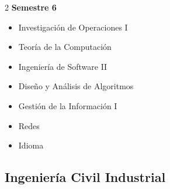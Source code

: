 \documentclass[12pt,a4paper]{article}
\begin{document}
\begin{multicols}{2}
		\textbf{Semestre 6}
		\begin{itemize}
			\item Investigación de Operaciones I
			\item Teoría de la Computación
			\item Ingeniería de Software II
			\item Diseño y Análisis de Algoritmos
			\item Gestión de la Información I
			\item Redes
			\item Idioma
		\end{itemize}
	\end{multicols}
	
	\newpage
	
	\subsection{Ingeniería Civil Industrial}
	
\end{document}

